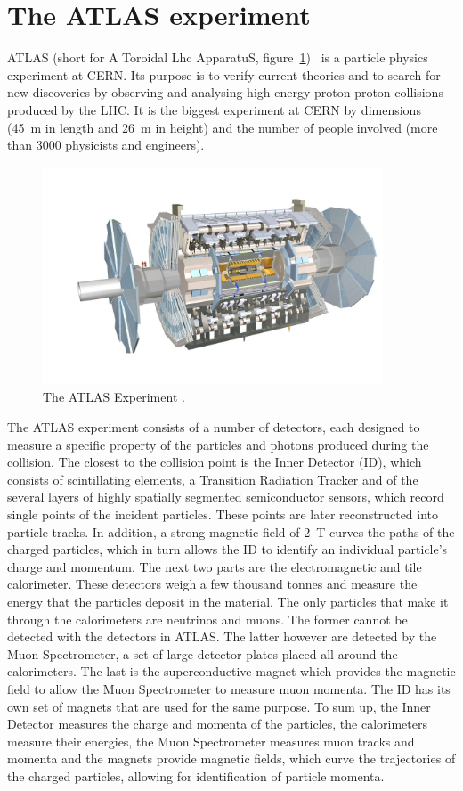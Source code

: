 \section{The ATLAS experiment}
ATLAS (short for A Toroidal Lhc ApparatuS, figure~\ref{fig:atlas})~\cite{} is a particle physics experiment at CERN. Its purpose is to verify current theories and to search for new discoveries by observing and analysing high energy proton-proton collisions produced by the LHC. It is the biggest experiment at CERN by dimensions (45~m in length and 26~m in height) and the number of people involved (more than 3000 physicists and engineers).
\begin{figure}[!t]
\centering
\includegraphics[width=0.9\textwidth]{01_introduction/pics/atlas3}
\caption{The ATLAS Experiment \cite{Pequenao:1095924}.}
\label{fig:atlas}
\end{figure}
The ATLAS experiment consists of a number of detectors, each designed to measure a specific property of the particles and photons produced during the collision. The closest to the collision point is the Inner Detector (ID), which consists of scintillating elements, a Transition Radiation Tracker and of the several layers of highly spatially segmented semiconductor sensors, which record single points of the incident particles. These points are later reconstructed into particle tracks. In addition, a strong magnetic field of 2~T curves the paths of the charged particles, which in turn allows the ID to identify an individual particle's charge and momentum. The next two parts are the electromagnetic and tile calorimeter. These detectors weigh a few thousand tonnes and measure the energy that the particles deposit in the material. The only particles that make it through the calorimeters are neutrinos and muons. The former cannot be detected with the detectors in ATLAS. The latter however are detected by the Muon Spectrometer, a set of large detector plates placed all around the calorimeters. The last is the superconductive magnet which provides the magnetic field to allow the Muon Spectrometer to measure muon momenta. The ID has its own set of magnets that are used for the same purpose. To sum up, the Inner Detector measures the charge and momenta of the particles, the calorimeters measure their energies, the Muon Spectrometer measures muon tracks and momenta and the magnets provide magnetic fields, which curve the trajectories of the charged particles, allowing for identification of particle momenta.

